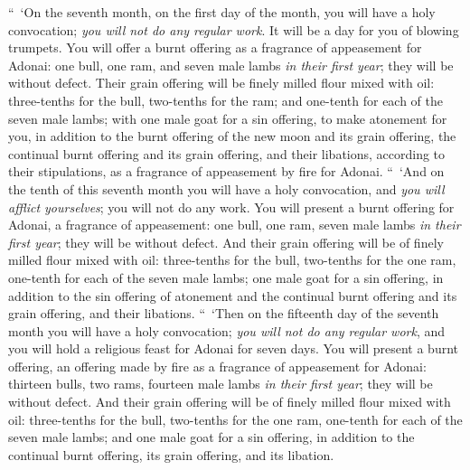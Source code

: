 \begin{biblechapter} %
 “ ‘On the seventh month, on the first day of the month, you will have a holy convocation; \textit{you will not do any regular work}. It will be a day for you of blowing trumpets.
\verse You will offer a burnt offering as a fragrance of appeasement for Adonai: one bull, one ram, and seven male lambs \textit{in their first year}; they will be without defect.
\verse Their grain offering will be finely milled flour mixed with oil: three-tenths for the bull, two-tenths for the ram;
\verse and one-tenth for each of the seven male lambs;
\verse with one male goat for a sin offering, to make atonement for you,
\verse in addition to the burnt offering of the new moon and its grain offering, the continual burnt offering and its grain offering, and their libations, according to their stipulations, as a fragrance of appeasement by fire for Adonai.
 “ ‘And on the tenth of this seventh month you will have a holy convocation, and \textit{you will afflict yourselves}; you will not do any work.
\verse You will present a burnt offering for Adonai, a fragrance of appeasement: one bull, one ram, seven male lambs \textit{in their first year}; they will be without defect.
\verse And their grain offering will be of finely milled flour mixed with oil: three-tenths for the bull, two-tenths for the one ram,
\verse one-tenth for each of the seven male lambs;
\verse one male goat for a sin offering, in addition to the sin offering of atonement and the continual burnt offering and its grain offering, and their libations.
\verse “ ‘Then on the fifteenth day of the seventh month you will have a holy convocation; \textit{you will not do any regular work}, and you will hold a religious feast for Adonai for seven days.
\verse You will present a burnt offering, an offering made by fire as a fragrance of appeasement for Adonai: thirteen bulls, two rams, fourteen male lambs \textit{in their first year}; they will be without defect.
\verse And their grain offering will be of finely milled flour mixed with oil: three-tenths for the bull, two-tenths for the one ram,
\verse one-tenth for each of the seven male lambs;
\verse and one male goat for a sin offering, in addition to the continual burnt offering, its grain offering, and its libation.

\end{biblechapter}
